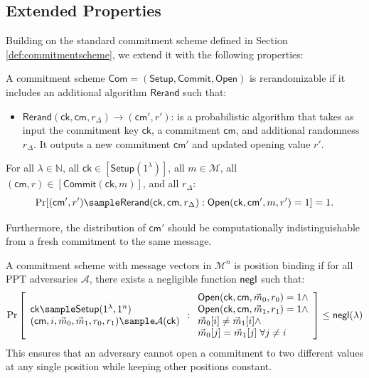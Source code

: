 \subsection{Extended Properties}

Building on the standard commitment scheme defined in Section \ref{def:commitmentscheme}, we extend it with the following properties:

\begin{definition}[Rerandomizability]
A commitment scheme $\mathsf{Com} = (\mathsf{Setup}, \mathsf{Commit}, \mathsf{Open})$ is rerandomizable if it includes an additional algorithm $\mathsf{Rerand}$ such that:

\begin{itemize}
\item $\mathsf{Rerand}(\mathsf{ck}, \mathsf{cm}, r_\Delta) \rightarrow (\mathsf{cm}', r')$: is a probabilistic algorithm that takes as input the commitment key $\mathsf{ck}$, a commitment $\mathsf{cm}$, and additional randomness $r_\Delta$. It outputs a new commitment $\mathsf{cm}'$ and updated opening value $r'$.
\end{itemize}

For all $\lambda \in \mathbb{N}$, all $\mathsf{ck} \in [\mathsf{Setup}(1^\lambda)]$, all $m \in \mathcal{M}$, all $(\mathsf{cm}, r) \in [\mathsf{Commit}(\mathsf{ck}, m)]$, and all $r_\Delta$:
$$\Pr[(\mathsf{cm}', r') \sample \mathsf{Rerand}(\mathsf{ck}, \mathsf{cm}, r_\Delta) : \mathsf{Open}(\mathsf{ck}, \mathsf{cm}', m, r') = 1] = 1.$$

Furthermore, the distribution of $\mathsf{cm}'$ should be computationally indistinguishable from a fresh commitment to the same message.
\end{definition}


\begin{definition}
A commitment scheme with message vectors in $\mathcal{M}^n$ is position binding if for all PPT adversaries $\mathcal{A}$, there exists a negligible function $\mathsf{negl}$ such that:
\[
    \Pr
    \left[
        \begin{array}{l}
        \mathsf{ck} \sample \mathsf{Setup}(1^\lambda, 1^n) \\
        (\mathsf{cm}, i, \vec{m}_0, \vec{m}_1, r_0, r_1) \sample \mathcal{A}(\mathsf{ck}) 
        \end{array}
        : \begin{array}{l}
            \mathsf{Open}(\mathsf{ck}, \mathsf{cm}, \vec{m}_0, r_0) = 1 \land \\
            \mathsf{Open}(\mathsf{ck}, \mathsf{cm}, \vec{m}_1, r_1) = 1 \land \\
            \vec{m}_0[i] \neq \vec{m}_1[i] \land \\
            \vec{m}_0[j] = \vec{m}_1[j] \; \forall j \neq i
          \end{array}
    \right] \leq \negl(\lambda)
\]
This ensures that an adversary cannot open a commitment to two different values at any single position while keeping other positions constant.
\end{definition}


